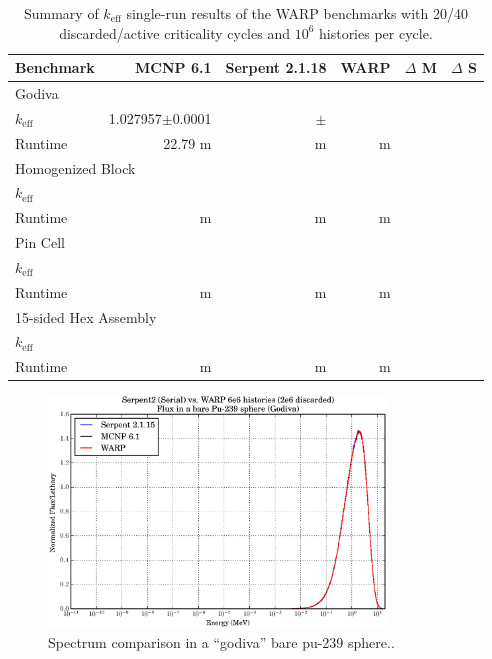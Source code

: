 \begin{table}[h]
\centering
\caption{Summary of $k_\mathrm{eff}$ single-run results of the WARP benchmarks with 20/40 discarded/active criticality cycles and $10^6$ histories per cycle.}
\label{benchmark_summary}
\begin{tabular}{| l | r | r | r | r | r |}
 \hline
 Benchmark & MCNP 6.1 & Serpent 2.1.18 & WARP & $\Delta$ M & $\Delta$ S  \\
\hline
\hline
\multicolumn{6}{|l|}{Godiva}  \\
\hline
 $k_\mathrm{eff}$ & 1.027957$\pm$0.0001 & $\pm$ &  &  &   \\
 \hline
 Runtime               & 22.79 m &  m &  m &   &   \\
 \hline
 \hline
\multicolumn{6}{|l|}{Homogenized Block }\\
\hline
 $k_\mathrm{eff}$ & &  &  & &    \\
 \hline
 Runtime               & m &  m &  m & &  \\
 \hline
  \hline
\multicolumn{6}{|l|}{Pin Cell}\\
\hline
 $k_\mathrm{eff}$ & &  &  & &    \\
 \hline
 Runtime               & m &  m &  m & &  \\
 \hline
  \hline
\multicolumn{6}{|l|}{15-sided Hex Assembly}\\
\hline
 $k_\mathrm{eff}$ & &  &  & &    \\
 \hline
 Runtime               & m &  m &  m & &  \\
 \hline
\end{tabular}
\end{table}

\begin{figure}[h!] 
\centering
\includegraphics[width=0.8\textwidth]{graphics/finalresults/godiva_spec.eps}
\caption{Spectrum comparison in a ``godiva'' bare pu-239 sphere.. \label{godiva_spec} }
\end{figure}

